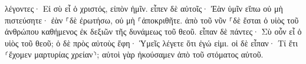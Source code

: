 \documentclass{openreader}
\begin{document}
λέγοντες· Εἰ σὺ εἶ ὁ χριστός, εἰπὸν ἡμῖν. εἶπεν δὲ αὐτοῖς· Ἐὰν ὑμῖν εἴπω οὐ μὴ πιστεύσητε· 
ἐὰν ⸀δὲ ἐρωτήσω, οὐ μὴ ⸀ἀποκριθῆτε. 
ἀπὸ τοῦ νῦν ⸀δὲ ἔσται ὁ υἱὸς τοῦ ἀνθρώπου καθήμενος ἐκ δεξιῶν τῆς δυνάμεως τοῦ θεοῦ. 
εἶπαν δὲ πάντες· Σὺ οὖν εἶ ὁ υἱὸς τοῦ θεοῦ; ὁ δὲ πρὸς αὐτοὺς ἔφη· Ὑμεῖς λέγετε ὅτι ἐγώ εἰμι. 
οἱ δὲ εἶπαν· Τί ἔτι ⸂ἔχομεν μαρτυρίας χρείαν⸃; αὐτοὶ γὰρ ἠκούσαμεν ἀπὸ τοῦ στόματος αὐτοῦ. 
\end{document}
